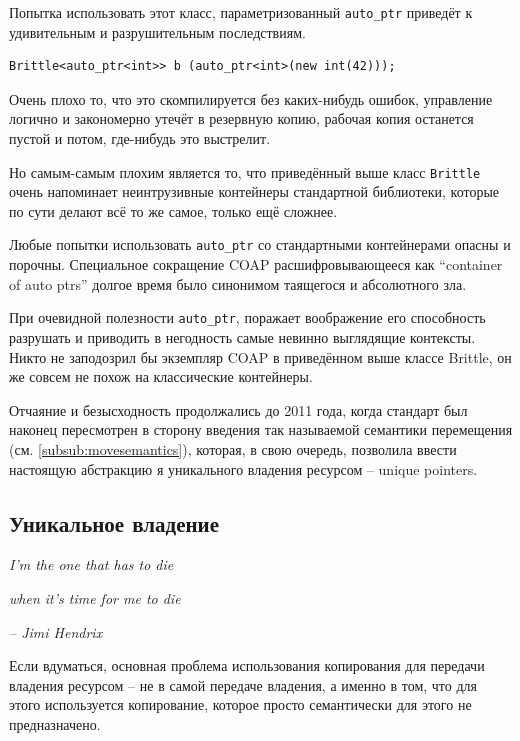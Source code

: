 \documentclass[a4paper,12pt,oneside]{book}
\begin{document}
Попытка использовать этот класс, параметризованный \lstinline!auto_ptr! приведёт к удивительным и разрушительным последствиям.

\begin{lstlisting}
Brittle<auto_ptr<int>> b (auto_ptr<int>(new int(42)));
\end{lstlisting}

Очень плохо то, что это скомпилируется без каких-нибудь ошибок, управление логично и закономерно утечёт в резервную копию, рабочая копия останется пустой и потом, где-нибудь это выстрелит.

Но самым-самым плохим является то, что приведённый выше класс \lstinline!Brittle! очень напоминает неинтрузивные контейнеры стандартной библиотеки, которые по сути делают всё то же самое, только ещё сложнее.

Любые попытки использовать \lstinline!auto_ptr! со стандартными контейнерами опасны и порочны. Специальное сокращение COAP расшифровывающееся как ``container of auto ptrs'' долгое время было синонимом таящегося и абсолютного зла.

При очевидной полезности \lstinline!auto_ptr!, поражает воображение его способность разрушать и приводить в негодность самые невинно выглядящие контексты. Никто не заподозрил бы экземпляр COAP в приведённом выше классе Brittle, он же совсем не похож на классические контейнеры.

Отчаяние и безысходность продолжались до 2011 года, когда стандарт был наконец пересмотрен в сторону введения так называемой семантики перемещения (см. \ref{subsub:movesemantics}), которая, в свою очередь, позволила ввести настоящую абстракцию я уникального владения ресурсом -- unique pointers.

\subsection{Уникальное владение}\label{subsub:uniqueptrs}

\hfill\textit{I'm the one that has to die}

\hfill\textit{when it's time for me to die}{\vspace{0.5em}}

\hfill\textit{-- Jimi Hendrix}

Если вдуматься, основная проблема использования копирования для передачи владения ресурсом -- не в самой передаче владения, а именно в том, что для этого используется копирование, которое просто семантически для этого не предназначено.
\end{document}
